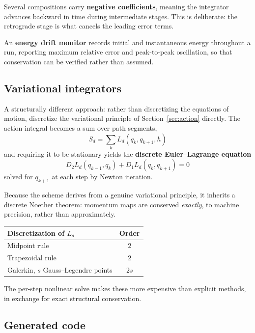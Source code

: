 \documentclass[11pt,a4paper]{article}
\begin{document}
Several compositions carry \textbf{negative coefficients}, meaning the integrator advances backward in
time during intermediate stages. This is deliberate: the retrograde stage is what cancels the leading
error terms.

An \textbf{energy drift monitor} records initial and instantaneous energy throughout a run, reporting
maximum relative error and peak-to-peak oscillation, so that conservation can be verified rather than
assumed.

\subsection{Variational integrators}

A structurally different approach: rather than discretizing the equations of motion, discretize the
variational principle of Section~\ref{sec:action} directly. The action integral becomes a sum over
path segments,
\begin{equation}
S_d = \sum_k L_d(q_k, q_{k+1}, h)
\end{equation}
and requiring it to be stationary yields the \textbf{discrete Euler--Lagrange equation}
\begin{equation}
D_2 L_d(q_{k-1}, q_k) + D_1 L_d(q_k, q_{k+1}) = 0
\end{equation}
solved for $q_{k+1}$ at each step by Newton iteration.

Because the scheme derives from a genuine variational principle, it inherits a discrete Noether
theorem: momentum maps are conserved \emph{exactly}, to machine precision, rather than approximately.

\begin{center}
\begin{tabular}{@{}L{7.6cm}c@{}}
\toprule
\textbf{Discretization of $L_d$} & \textbf{Order} \\
\midrule
Midpoint rule                            & 2 \\
Trapezoidal rule                         & 2 \\
Galerkin, $s$ Gauss--Legendre points     & $2s$ \\
\bottomrule
\end{tabular}
\end{center}

The per-step nonlinear solve makes these more expensive than explicit methods, in exchange for exact
structural conservation.

\subsection{Generated code}
\label{sec:codegen}
\end{document}
